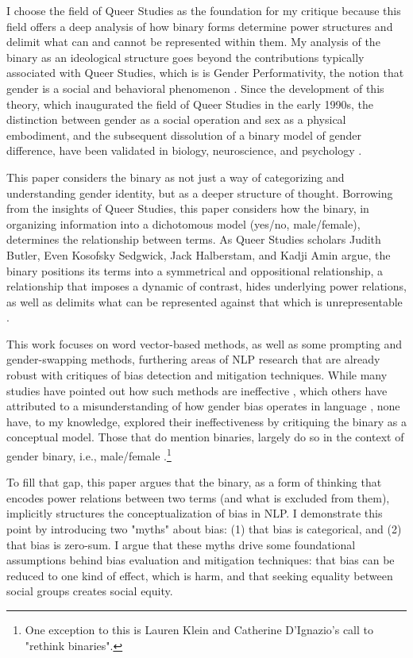 \documentclass[11pt]{article}
\begin{document}
I choose the field of Queer Studies as the foundation for my
critique because this field offers a deep analysis of how binary forms
determine power structures and delimit what can and cannot be
represented within them. My analysis of the binary as an ideological
structure goes beyond the contributions typically associated with
Queer Studies, which is is Gender Performativity, the notion that
gender is a social and behavioral phenomenon \citep{butler:1990}.
Since the development of this theory, which inaugurated the field of
Queer Studies in the early 1990s, the distinction between gender as a
social operation and sex as a physical embodiment, and the subsequent
dissolution of a binary model of gender difference, have been
validated in biology, neuroscience, and
psychology \citep{ainsworth:2015,hyde:2019,joel:2021}.

This paper considers the binary as not just a way of categorizing and understanding
gender identity, but as a deeper structure of thought. Borrowing from
the insights of Queer Studies, this paper considers how the binary, in
organizing information into a dichotomous model (yes/no, male/female),
determines the relationship between terms. As Queer Studies scholars
Judith Butler, Even Kosofsky Sedgwick, Jack Halberstam, and Kadji Amin
argue, the binary positions its terms into a symmetrical
and oppositional relationship, a relationship that imposes a dynamic
of contrast, hides underlying power relations, as well as delimits
what can be represented against that which is
unrepresentable \citep{butler:1993,sedgwick:1990,halberstam:1998,amin:2022}.

This work focuses on word vector-based methods, as well as some prompting and gender-swapping methods, furthering areas of NLP research that are already robust with
critiques of bias detection and mitigation techniques. While many
studies have pointed out how such methods are ineffective  \citep{gonen:2019,blodgett:2021}, which others have
attributed to a misunderstanding of how gender bias operates in
language \citep{devinney:2022,hitti:2019,nemani:2023,meade:2022,caliskan:2022},
none have, to my knowledge, explored their ineffectiveness by
critiquing the binary as a conceptual model. Those that do mention
binaries, largely do so in the context of gender binary, i.e.,
male/female \citep{hitti:2019,nemani:2023,klein:2024-1}.\footnote{One exception to this is Lauren Klein and Catherine D'Ignazio's call to "rethink binaries".}

To fill that gap, this paper argues that the binary, as a form of
thinking that encodes power relations between two terms (and what is
excluded from them), implicitly structures the conceptualization of
bias in NLP. I demonstrate this point by introducing two "myths" about bias: (1) that bias is
categorical, and (2) that bias is zero-sum. I argue that these myths drive some foundational
assumptions behind bias evaluation and mitigation techniques: 
that bias can be reduced to one kind of effect, which is harm, and that 
seeking equality between social groups creates social equity.
\end{document}
